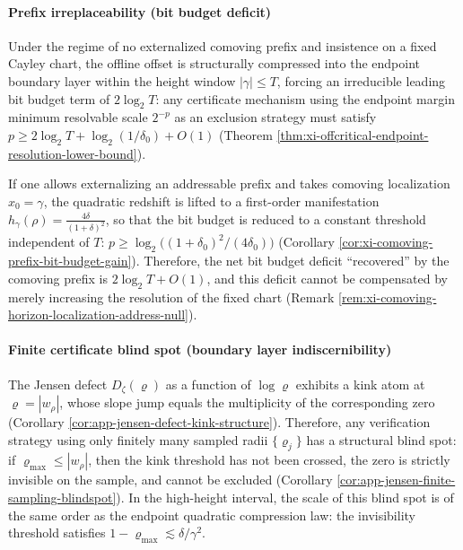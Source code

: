 \paragraph{Prefix irreplaceability (bit budget deficit)}
Under the regime of no externalized comoving prefix and insistence on a fixed Cayley chart, the offline offset is structurally compressed into the endpoint boundary layer within the height window \(|\gamma|\le T\), forcing an irreducible leading bit budget term of \(2\log_2T\):
any certificate mechanism using the endpoint margin minimum resolvable scale \(2^{-p}\) as an exclusion strategy must satisfy
\(
p\ge 2\log_2T+\log_2(1/\delta_0)+O(1)
\)
(Theorem \ref{thm:xi-offcritical-endpoint-resolution-lower-bound}).
\par
If one allows externalizing an addressable prefix and takes comoving localization \(x_0=\gamma\), the quadratic redshift is lifted to a first-order manifestation \(h_{\gamma}(\rho)=\frac{4\delta}{(1+\delta)^2}\), so that the bit budget is reduced to a constant threshold independent of \(T\):
\(
p\ge \log_2\!\bigl((1+\delta_0)^2/(4\delta_0)\bigr)
\)
(Corollary \ref{cor:xi-comoving-prefix-bit-budget-gain}).
Therefore, the net bit budget deficit ``recovered'' by the comoving prefix is \(2\log_2T+O(1)\), and this deficit cannot be compensated by merely increasing the resolution of the fixed chart (Remark \ref{rem:xi-comoving-horizon-localization-address-null}).

\paragraph{Finite certificate blind spot (boundary layer indiscernibility)}
The Jensen defect \(D_\zeta(\varrho)\) as a function of \(\log\varrho\) exhibits a kink atom at \(\varrho=|w_\rho|\), whose slope jump equals the multiplicity of the corresponding zero (Corollary \ref{cor:app-jensen-defect-kink-structure}).
Therefore, any verification strategy using only finitely many sampled radii \(\{\varrho_j\}\) has a structural blind spot: if \(\varrho_{\max}\le |w_\rho|\), then the kink threshold has not been crossed, the zero is strictly invisible on the sample, and cannot be excluded (Corollary \ref{cor:app-jensen-finite-sampling-blindspot}).
In the high-height interval, the scale of this blind spot is of the same order as the endpoint quadratic compression law: the invisibility threshold satisfies \(1-\varrho_{\max}\lesssim \delta/\gamma^2\).


